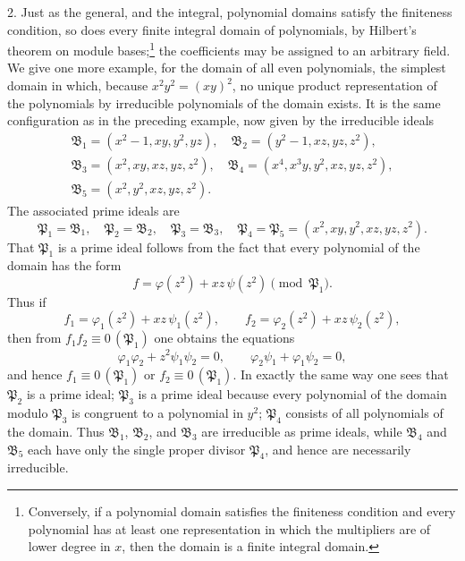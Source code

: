 \documentclass[11pt]{article}
\newcommand{\ideal}[1]{\mathfrak{#1}}
\newcommand{\eqzero}[1]{\equiv 0\,(#1)}
\begin{document}
2. Just as the general, and the integral, polynomial domains satisfy the finiteness condition, so does every finite integral domain of polynomials, by Hilbert's theorem on module bases;\footnote{Conversely, if a polynomial domain satisfies the finiteness condition and every polynomial has at least one representation in which the multipliers are of lower degree in $x$, then the domain is a finite integral domain.} the coefficients may be assigned to an arbitrary field. We give one more example, for the domain of all even polynomials, the simplest domain in which, because $x^2y^2=(xy)^2$, no unique product representation of the polynomials by irreducible polynomials of the domain exists. It is the same configuration as in the preceding example, now given by the irreducible ideals
\[
\begin{gathered}
 \ideal B_1=(x^2-1,xy,y^2,yz),\quad
 \ideal B_2=(y^2-1,xz,yz,z^2),\\
 \ideal B_3=(x^2,xy,xz,yz,z^2),\quad
 \ideal B_4=(x^4,x^3y,y^2,xz,yz,z^2),\\
 \ideal B_5=(x^2,y^2,xz,yz,z^2).
\end{gathered}
\]
The associated prime ideals are
\[
 \ideal P_1=\ideal B_1,
 \quad \ideal P_2=\ideal B_2,
 \quad \ideal P_3=\ideal B_3,
 \quad \ideal P_4=\ideal P_5=(x^2,xy,y^2,xz,yz,z^2).
\]
That $\ideal P_1$ is a prime ideal follows from the fact that every polynomial of the domain has the form
\[
 f=\varphi(z^2)+xz\,\psi(z^2)\pmod{\ideal P_1}.
\]
Thus if
\[
 f_1=\varphi_1(z^2)+xz\,\psi_1(z^2),
 \qquad
 f_2=\varphi_2(z^2)+xz\,\psi_2(z^2),
\]
then from $f_1f_2\eqzero{\ideal P_1}$ one obtains the equations
\[
 \varphi_1\varphi_2+z^2\psi_1\psi_2=0,
 \qquad
 \varphi_2\psi_1+\varphi_1\psi_2=0,
\]
and hence $f_1\eqzero{\ideal P_1}$ or $f_2\eqzero{\ideal P_1}$. In exactly the same way one sees that $\ideal P_2$ is a prime ideal; $\ideal P_3$ is a prime ideal because every polynomial of the domain modulo $\ideal P_3$ is congruent to a polynomial in $y^2$; $\ideal P_4$ consists of all polynomials of the domain. Thus $\ideal B_1$, $\ideal B_2$, and $\ideal B_3$ are irreducible as prime ideals, while $\ideal B_4$ and $\ideal B_5$ each have only the single proper divisor $\ideal P_4$, and hence are necessarily irreducible.
\end{document}
